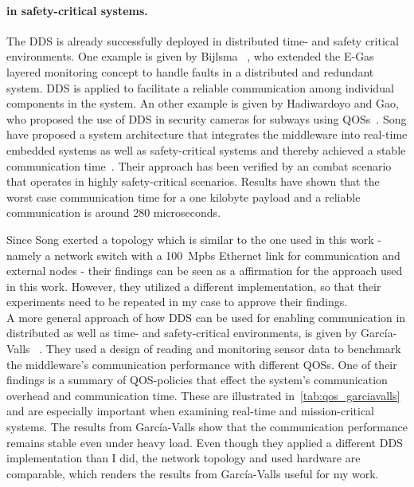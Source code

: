 \paragraph{ in safety-critical systems.}
The \gls*{DDS} is already successfully deployed in distributed time- and safety critical environments.
One example is given by Bijlsma \etal~\cite{DistributedSafety2020}, who extended the E-Gas layered monitoring concept to handle faults in a distributed and redundant system.
\Gls*{DDS} is applied to facilitate a reliable communication among individual components in the system.
An other example is given by Hadiwardoyo and Gao, who proposed the use of \gls*{DDS} in security cameras for subways using \glspl*{QOS}~\cite{DDSInSubways}.
Song \etal have proposed a system architecture that integrates the  middleware into real-time embedded systems as well as safety-critical systems and thereby achieved a stable communication time~\cite{SongDDSInRealTimeSystems}.
Their approach has been verified by an  combat scenario that operates in highly safety-critical scenarios.
Results have shown that the worst case communication time for a one kilobyte payload and a reliable communication  is around 280 microseconds.

Since Song \etal exerted a topology which is similar to the one used in this work - namely a network switch with a 100~Mpbs Ethernet link for communication and external nodes - their findings can be seen as a affirmation for the approach used in this work.
However, they utilized a different  implementation, so that their experiments need to be repeated in my case to approve their findings. 
\\

A more general approach of how \gls*{DDS} can be used for enabling communication in distributed as well as time- and safety-critical environments, is given by García-Valls \etal~\cite{GarciaVallsDDSInDistributed}.
They used a design of reading and monitoring sensor data to benchmark the middleware's communication performance with different \glspl*{QOS}.
One of their findings is a summary of \gls*{QOS}-policies that effect the system's communication overhead and communication time.
These are illustrated in~\autoref{tab:qos_garciavalls} and are especially important when examining real-time and mission-critical systems.
The results from García-Valls \etal show that the communication performance remains stable even under heavy load.
Even though they applied a different \gls*{DDS} implementation than I did, the network topology and used hardware are comparable, which renders the results from García-Valls \etal useful for my work.

